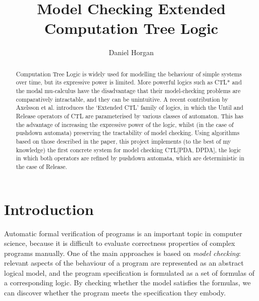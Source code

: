 \documentclass[11pt]{article}
\theoremstyle{definition}
\begin{document}
\title{Model Checking Extended Computation Tree Logic}
\author{Daniel Horgan}
\maketitle

\begin{abstract}

Computation Tree Logic is widely used for modelling the behaviour of simple
systems over time, but its expressive power is limited.  More powerful logics
such as CTL* and the modal mu-calculus have the disadvantage that their
model-checking problems are comparatively intractable, and they can be
unintuitive.  A recent contribution by Axelsson et al. introduces the `Extended
CTL' family of logics, in which the Until and Release operators of CTL are
parameterised by various classes of automaton. This has the advantage of
increasing the expressive power of the logic, whilst (in the case of pushdown
automata) preserving the tractability of model checking. 
Using algorithms based on those described in the paper, this project implements
(to the best of my knowledge) the first concrete system for model checking
CTL[PDA, DPDA], the logic in which both operators are refined by pushdown
automata, which are deterministic in the case of Release. 





\end{abstract}

\newpage

\tableofcontents
\setcounter{tocdepth}{3}

\newpage

\section{Introduction}

Automatic formal verification of programs is an important topic in computer
science, because it is difficult to evaluate correctness properties of complex
programs manually. One of the main approaches is based on \textit{model
checking}: relevant aspects of the behaviour of a program are represented as an
abstract logical model, and the program specification is formulated as a set of
formulas of a corresponding logic. By checking whether the model satisfies the
formulas, we can discover whether the program meets the specification they
embody.
\end{document}
